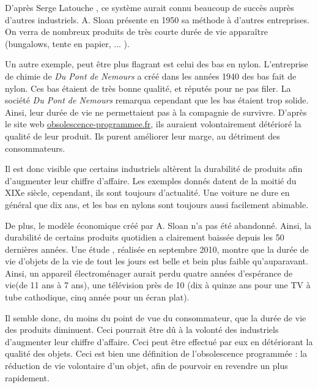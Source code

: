 D'après Serge Latouche \cite{bpc}, ce système aurait connu beaucoup de succès auprès d'autres industriels. A. Sloan présente en 1950 sa méthode à d'autres entreprises. On verra de nombreux produits de très courte durée de vie apparaître (bungalows, tente en papier, ... ).

Un autre exemple, peut être plus flagrant est celui des bas en nylon.  L'entreprise de chimie de \textit{Du Pont de Nemours} a créé dans les années 1940 des bas fait de nylon. Ces bas étaient de très bonne qualité, et réputés pour ne pas filer. La société \textit{Du Pont de Nemours} remarqua cependant que les bas étaient trop solide. Ainsi, leur durée de vie ne permettaient pas à la compagnie de survivre. D'après le site web \url{obsolescence-programmee.fr}, ils auraient volontairement détérioré la qualité de leur produit. Ils purent améliorer leur marge, au détriment des consommateurs. 

\smallbreak

Il est donc visible que certains industriels altèrent la durabilité de produits afin d'augmenter leur chiffre d'affaire. Les exemples donnés datent de la moitié du XIXe siècle, cependant, ils sont toujours d'actualité. Une voiture ne dure en général que dix ans, et les bas en nylons sont toujours aussi facilement abimable. 

De plus, le modèle économique créé par A. Sloan n'a pas été abandonné. Ainsi, la durabilité de certains produits quotidien a clairement baissée depuis les 50 dernières années. 
Une étude \cite{opSsg}, réalisée en septembre 2010, montre que la durée de vie d'objets de la vie de tout les jours est belle et bein plus faible qu'auparavant. Ainsi, un appareil électroménager aurait perdu quatre années d'espérance de vie(de 11 ans à 7 ans), une télévision près de 10 (dix à quinze ans pour une TV à tube cathodique, cinq année pour un écran plat). 

Il semble donc, du moins du point de vue du consommateur, que la durée de vie des produits diminuent. Ceci pourrait être dû à la volonté des industriels d'augmenter leur chiffre d'affaire. Ceci peut être effectué par eux en détériorant la qualité des objets. Ceci est bien une définition de l'obsolescence programmée : la réduction de vie volontaire d'un objet, afin de pourvoir en revendre un plus rapidement. 
